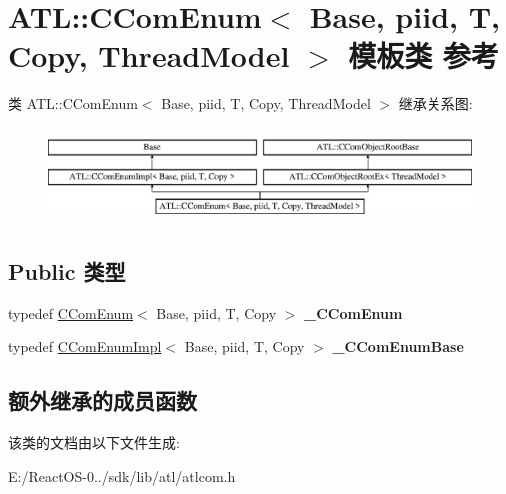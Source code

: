 \hypertarget{class_a_t_l_1_1_c_com_enum}{}\section{A\+TL\+:\+:C\+Com\+Enum$<$ Base, piid, T, Copy, Thread\+Model $>$ 模板类 参考}
\label{class_a_t_l_1_1_c_com_enum}
类 A\+TL\+:\+:C\+Com\+Enum$<$ Base, piid, T, Copy, Thread\+Model $>$ 继承关系图\+:\begin{figure}[H]
\begin{center}
\leavevmode
\includegraphics[height=2.514970cm]{class_a_t_l_1_1_c_com_enum}
\end{center}
\end{figure}
\subsection*{Public 类型}
\begin{DoxyCompactItemize}
\item 
\mbox{\label{class_a_t_l_1_1_c_com_enum_a384c42da5f8512bb47b1041ee80df7f1}} 
typedef \hyperlink{class_a_t_l_1_1_c_com_enum}{C\+Com\+Enum}$<$ Base, piid, T, Copy $>$ {\bfseries \+\_\+\+C\+Com\+Enum}
\item 
\mbox{\label{class_a_t_l_1_1_c_com_enum_ac21a5e3633e657bb39ae32af818f677a}} 
typedef \hyperlink{class_a_t_l_1_1_c_com_enum_impl}{C\+Com\+Enum\+Impl}$<$ Base, piid, T, Copy $>$ {\bfseries \+\_\+\+C\+Com\+Enum\+Base}
\end{DoxyCompactItemize}
\subsection*{额外继承的成员函数}


该类的文档由以下文件生成\+:\begin{DoxyCompactItemize}
\item 
E\+:/\+React\+O\+S-\/0../sdk/lib/atl/atlcom.\+h\end{DoxyCompactItemize}
